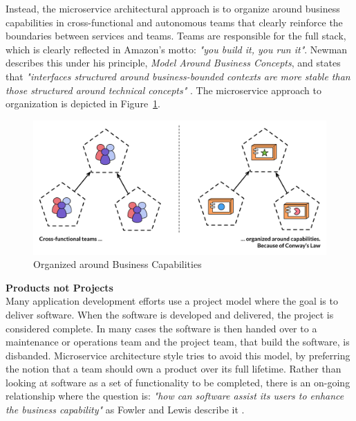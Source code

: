 \noindent Instead, the microservice architectural approach is to organize around business capabilities in cross-functional and autonomous teams that clearly reinforce the boundaries between services and teams. Teams are responsible for the full stack, which is clearly reflected in Amazon's motto: \textit{"you build it, you run it"}. Newman describes this under his principle, \textit{Model Around Business Concepts}, and states that \textit{"interfaces structured around business-bounded contexts are more stable than those structured around technical concepts"} \cite[p. 246]{newman2015building}. The microservice approach to organization is depicted in Figure~\ref{fig:micro_business_capabilities}.

\begin{figure}[H]
    \centering
    \includegraphics[width=\textwidth]{figures/microservices_capabilities}
    \caption{Organized around Business Capabilities \cite[p. 6]{lewis2014microservices}}
    \label{fig:micro_business_capabilities}
\end{figure}






\newpage
\noindent\textbf{Products not Projects} \\
Many application development efforts use a project model where the goal is to deliver software. When the software is developed and delivered, the project is considered complete. In many cases the software is then handed over to a maintenance or operations team and the project team, that build the software, is disbanded. Microservice architecture style tries to avoid this model, by preferring the notion that a team should own a product over its full lifetime. Rather than looking at software as a set of functionality to be completed, there is an on-going relationship where the question is: \textit{"how can software assist its users to enhance the business capability"} as Fowler and Lewis describe it \cite[p. 7]{lewis2014microservices}.\\

